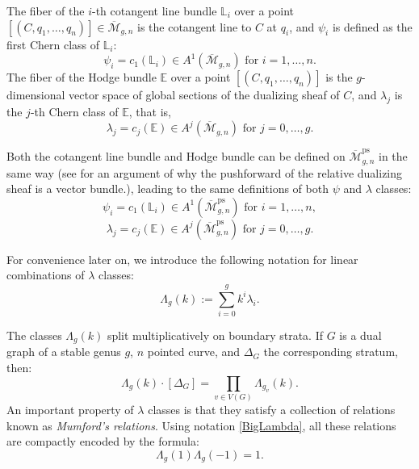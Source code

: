\documentclass[leqno,12pt]{amsart}
\theoremstyle{remark}
\numberwithin{equation}{section}
\DeclareMathOperator{\ps}{ps}
\begin{document}

The fiber of the $i$-th cotangent line bundle $\mathbb{L}_i$ over a point $[(C, q_1, \dots, q_n)] \in \overline{\mathcal{M}}_{g, n}$ is the cotangent line to $C$ at $q_i$, and $\psi_i$ is defined as the first Chern class of $\mathbb{L}_i$:
$$
\psi_i = c_1(\mathbb{L}_i) \in A^1(\overline{\mathcal{M}}_{g, n}) \text{ for } i = 1, \dots, n.
$$
The fiber of the Hodge bundle $\mathbb{E}$ over a point $[(C, q_1, \dots, q_n)]$ is the $g$-dimensional vector space of global sections of the dualizing sheaf of $C$, and $\lambda_j$ is the $j$-th Chern class of $\mathbb{E}$, that is,
$$
\lambda_j = c_j(\mathbb{E}) \in A^j(\overline{\mathcal{M}}_{g, n}) \text{ for } j = 0, \dots, g.
$$

Both the cotangent line bundle and Hodge bundle can be defined on $\overline{\mathcal{M}}^{\ps}_{g, n}$ in the same way (see \cite[Section 2.2, footnote 1]{PSHI} for an argument of why the pushforward of the relative dualizing sheaf is a vector bundle.), leading to the same definitions of both $\psi$ and $\lambda$ classes: 
$$
\psi_i = c_1(\mathbb{L}_i) \in A^1(\overline{\mathcal{M}}^{\ps}_{g, n}) \text{ for } i = 1, \dots, n,
$$ 
$$
\lambda_j = c_j(\mathbb{E}) \in A^j(\overline{\mathcal{M}}^{\ps}_{g, n}) \text{ for } j = 0, \dots, g.
$$ 

For convenience later on, we introduce the following notation for linear combinations of $\lambda$ classes:
\begin{equation}\label{BigLambda}
    \Lambda_g(k) := \sum_{i=0}^g k^i\lambda_{i}.
\end{equation}

The classes $\Lambda_g(k)$ split multiplicatively on boundary strata. If $G$ is a dual graph of a stable genus $g$, $n$ pointed curve, and $\Delta_G$ the corresponding stratum, then:
\begin{equation}\label{eq:splitLambda}
  \Lambda_g(k) \cdot [\Delta_G] = \prod_{v\in V(G)}  \Lambda_{g_v}(k). 
\end{equation}
An important property of $\lambda$ classes is that they satisfy a collection of relations known as {\it Mumford's relations}. Using notation \eqref{BigLambda}, all these relations are compactly encoded by the formula:
\begin{equation}\label{mumfrel}
 \Lambda_g(1)\Lambda_g(-1) = 1.   
\end{equation}
\end{document}
